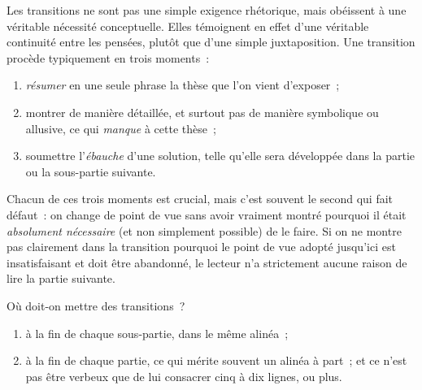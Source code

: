 \documentclass[a4paper,11pt]{article}
\begin{document}
Les transitions ne sont pas une simple exigence rhétorique, mais
obéissent à une véritable nécessité conceptuelle. Elles témoignent en
effet d'une véritable continuité entre les pensées, plutôt que d'une
simple juxtaposition. Une transition procède typiquement en trois
moments~:
\begin{enumerate}
\item \emph{résumer} en une seule phrase la thèse que l'on vient
  d'exposer~;
\item montrer de manière détaillée, et surtout pas de manière symbolique
  ou allusive, ce qui \emph{manque} à cette thèse~;
\item soumettre l'\emph{ébauche} d'une solution, telle qu'elle sera
  développée dans la partie ou la sous-partie suivante.
\end{enumerate}

\par

Chacun de ces trois moments est crucial, mais c'est souvent le second
qui fait défaut~: on change de point de vue sans avoir vraiment montré
pourquoi il était \emph{absolument nécessaire} (et non simplement
possible) de le faire. Si on ne montre pas clairement dans la transition
pourquoi le point de vue adopté jusqu'ici est insatisfaisant et doit
être abandonné, le lecteur n'a strictement aucune raison de lire la
partie suivante.

\par

Où doit-on mettre des transitions~?
\begin{enumerate}
\item à la fin de chaque sous-partie, dans le même alinéa~;
\item à la fin de chaque partie, ce qui mérite souvent un alinéa à
  part~; et ce n'est pas être verbeux que de lui consacrer cinq à dix
  lignes, ou plus.
\end{enumerate}

\par
\end{document}

